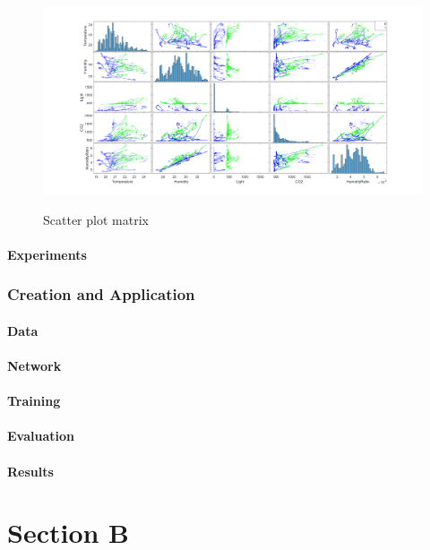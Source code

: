 \documentclass[a4paper, 11pt]{article}
\begin{document}
\begin{figure}[h]
  \caption{Scatter plot matrix}
  \centering
    \includegraphics[width=1\textwidth]{Plotmatrix.png}
    \label{fig:plotmatrix}
\end{figure}
\subsection*{Experiments}





\section*{Creation and Application}
\lipsum[2]

\subsection*{Data}
\lipsum[3]

\subsection*{Network}
\lipsum[4]

\subsection*{Training}
\lipsum[4]

\subsection*{Evaluation}
\lipsum[4]

\subsection*{Results}
\lipsum[4]





\part*{Section B}






\end{document}

